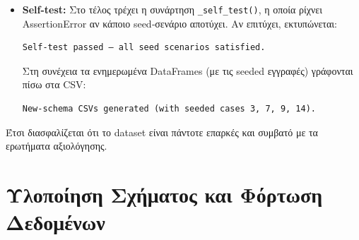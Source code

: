 \documentclass[a4paper,12pt]{article}
\begin{document}
\begin{itemize}
  \item \textbf{Self-test:}  
        Στο τέλος τρέχει η συνάρτηση \texttt{\_self\_test()}, η οποία
        ρίχνει AssertionError αν κάποιο seed‐σενάριο αποτύχει.  Αν
        επιτύχει, εκτυπώνεται:

\begin{verbatim}
Self-test passed – all seed scenarios satisfied.
\end{verbatim}

        Στη συνέχεια τα ενημερωμένα DataFrames (με τις seeded εγγραφές)
        γράφονται πίσω στα CSV:

\begin{verbatim}
New-schema CSVs generated (with seeded cases 3, 7, 9, 14).
\end{verbatim}

\end{itemize}


Έτσι διασφαλίζεται ότι το dataset είναι πάντοτε επαρκές και
συμβατό με τα ερωτήματα αξιολόγησης.


\section{Υλοποίηση Σχήματος και Φόρτωση Δεδομένων}
\end{document}

